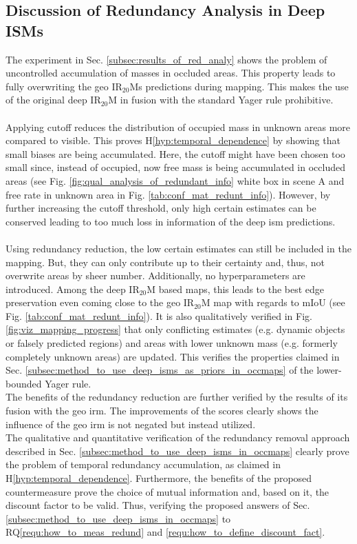 \subsection{Discussion of Redundancy Analysis in Deep ISMs}
\label{subsec:discussion_of_red_analy}
The experiment in Sec. \ref{subsec:results_of_red_analy} shows the problem of uncontrolled accumulation of masses in occluded areas. This property leads to fully overwriting the geo IR$_{20}$Ms predictions during mapping. This makes the use of the original deep IR$_{20}$M in fusion with the standard Yager rule prohibitive. 
\\\\
Applying cutoff reduces the distribution of occupied mass in unknown areas more compared to visible. This proves H\ref{hyp:temporal_dependence} by showing that small biases are being accumulated. Here, the cutoff might have been chosen too small since, instead of occupied, now free mass is being accumulated in occluded areas (see Fig. \ref{fig:qual_analysis_of_redundant_info} white box in scene A and free rate in unknown area in Fig. \ref{tab:conf_mat_redunt_info}). However, by further increasing the cutoff threshold, only high certain estimates can be conserved leading to too much loss in information of the deep \gls{ism} predictions. 
\\\\
Using redundancy reduction, the low certain estimates can still be included in the mapping. But, they can only contribute up to their certainty and, thus, not overwrite areas by sheer number. Additionally, no hyperparameters are introduced. Among the deep IR$_{20}$M based maps, this leads to the best edge preservation even coming close to the geo IR$_{20}$M map with regards to mIoU (see Fig. \ref{tab:conf_mat_redunt_info}). It is also qualitatively verified in Fig. \ref{fig:viz_mapping_progress} that only conflicting estimates (e.g. dynamic objects or falsely predicted regions) and areas with lower unknown mass (e.g. formerly completely unknown areas) are updated. This verifies the properties claimed in Sec. \ref{subsec:method_to_use_deep_isms_as_priors_in_occmaps} of the lower-bounded Yager rule.\\
The benefits of the redundancy reduction are further verified by the results of its fusion with the geo \gls{irm}. The improvements of the scores clearly shows the influence of the geo \gls{irm} is not negated but instead utilized.\\
The qualitative and quantitative verification of the redundancy removal approach described in Sec. \ref{subsec:method_to_use_deep_isms_in_occmaps} clearly prove the problem of temporal redundancy accumulation, as claimed in H\ref{hyp:temporal_dependence}. Furthermore, the benefits of the proposed countermeasure prove the choice of mutual information and, based on it, the discount factor to be valid. Thus, verifying the proposed answers of Sec. \ref{subsec:method_to_use_deep_isms_in_occmaps} to RQ\ref{requ:how_to_meas_redund} and \ref{requ:how_to_define_discount_fact}.
